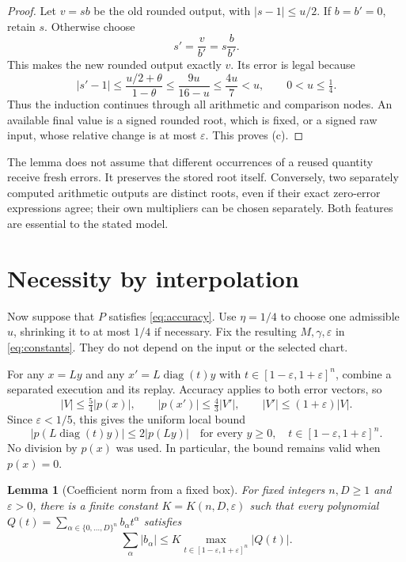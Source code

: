 \documentclass[11pt,a4paper]{article}
\newtheorem{lemma}[theorem]{Lemma}
\theoremstyle{definition}
\theoremstyle{remark}
\newcommand{\abs}[1]{\lvert #1\rvert}
\newcommand{\diag}{\operatorname{diag}}
\begin{document}
\begin{proof}
Let $v=sb$ be the old rounded output, with $\abs{s-1}\le u/2$.
If $b=b'=0$, retain $s$. Otherwise choose
\begin{equation}\label{eq:news}
 s'=\frac{v}{b'}=s\frac{b}{b'}.
\end{equation}
This makes the new rounded output exactly $v$. Its error is legal because
\begin{equation}\label{eq:budget}
 \abs{s'-1}\le\frac{u/2+\theta}{1-\theta}
 \le\frac{9u}{16-u}\le\frac{4u}{7}<u,
 \qquad 0<u\le\tfrac14.
\end{equation}
Thus the induction continues through all arithmetic and comparison nodes.
An available final value is a signed rounded root, which is fixed, or a signed
raw input, whose relative change is at most $\varepsilon$. This proves (c).
\end{proof}

The lemma does not assume that different occurrences of a reused quantity
receive fresh errors. It preserves the stored root itself. Conversely, two
separately computed arithmetic outputs are distinct roots, even if their
exact zero-error expressions agree; their own multipliers can be chosen
separately. Both features are essential to the stated model.

\section{Necessity by interpolation}

Now suppose that $P$ satisfies \eqref{eq:accuracy}. Use $\eta=1/4$ to choose
one admissible $u$, shrinking it to at most $1/4$ if necessary. Fix the resulting
$M,\gamma,\varepsilon$ in \eqref{eq:constants}. They do not depend on the input
or the selected chart.

For any $x=Ly$ and any $x'=L\diag(t)y$ with
$t\in[1-\varepsilon,1+\varepsilon]^n$, combine a separated execution and its
replay. Accuracy applies to both error vectors, so
\[
 \abs V\le\tfrac54\abs{p(x)},\qquad
 \abs{p(x')}\le\tfrac43\abs{V'},\qquad
 \abs{V'}\le(1+\varepsilon)\abs V.
\]
Since $\varepsilon<1/5$, this gives the uniform local bound
\begin{equation}\label{eq:local}
 \abs{p(L\diag(t)y)}\le2\abs{p(Ly)}
 \quad\text{for every }y\ge0,\quad
 t\in[1-\varepsilon,1+\varepsilon]^n.
\end{equation}
No division by $p(x)$ was used. In particular, the bound remains valid when
$p(x)=0$.

\begin{lemma}[Coefficient norm from a fixed box]\label{lem:interp}
For fixed integers $n,D\ge1$ and $\varepsilon>0$, there is a finite constant
$K=K(n,D,\varepsilon)$ such that every polynomial
$Q(t)=\sum_{\alpha\in\{0,\ldots,D\}^n}b_\alpha t^\alpha$ satisfies
\begin{equation}\label{eq:norm}
 \sum_\alpha\abs{b_\alpha}
 \le K\max_{t\in[1-\varepsilon,1+\varepsilon]^n}\abs{Q(t)}.
\end{equation}
\end{lemma}
\end{document}

